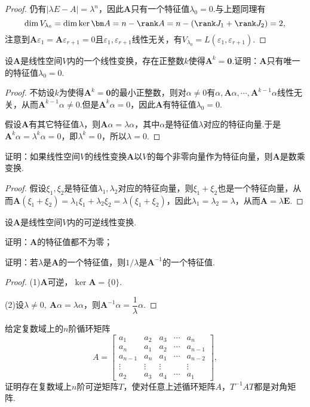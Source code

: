 \begin{proof}
	仍有$|\lambda E-A|=\lambda^n$，因此$\bm A$只有一个特征值$\lambda_0=0$.与上题同理有
	\[
		\dim V_{\lambda_0}=\dim\ker\bm A=n-\rank A=n-(\rank J_1+\rank J_2)=2,
	\]
	注意到$\bm A\varepsilon_1=\bm A\varepsilon_{r+1}=0$且$\varepsilon_1,\varepsilon_{r+1}$线性无关，有$V_{\lambda_0}=L(\varepsilon_1,\varepsilon_{r+1})$.
\end{proof}
\begin{prob}[7]
	设$\bm A$是线性空间$V$内的一个线性变换，存在正整数$k$使得$\bm A^k=\bm 0$.证明：$\bm A$只有唯一的特征值$\lambda_0=0$.
\end{prob}
\begin{proof}
	不妨设$k$为使得$\bm A^k=\bm 0$的最小正整数，则对$\alpha\ne0$有$\alpha,\bm A\alpha,\cdots,\bm A^{k-1}\alpha$线性无关，从而$\bm A^{k-1}\alpha\ne0$.但是$\bm A^k\alpha=0$，因此$\bm A$有特征值$\lambda_0=0$.

	假设$\bm A$有其它特征值$\lambda$，则$\bm A\alpha=\lambda\alpha$，其中$\alpha$是特征值$\lambda$对应的特征向量.于是$\bm A^k\alpha=\lambda^k\alpha=0$，即$\lambda^k=0$，所以$\lambda=0$.
\end{proof}
\begin{prob}[9]
	证明：如果线性空间$V$的线性变换$\bm A$以$V$的每个非零向量作为特征向量，则$\bm A$是数乘变换.
\end{prob}
\begin{proof}
	假设$\xi_1,\xi_2$是特征值$\lambda_1,\lambda_2$对应的特征向量，则$\xi_1+\xi_2$也是一个特征向量，从而$\bm A(\xi_1+\xi_2)=\lambda_1\xi_1+\lambda_2\xi_2=\lambda(\xi_1+\xi_2)$，因此$\lambda_1=\lambda_2=\lambda$，从而$\bm A=\lambda\bm E$.
\end{proof}
\begin{prob}[10]
	设$\bm A$是线性空间$V$内的可逆线性变换.
	\begin{mylist}
		\item 证明：$\bm A$的特征值都不为零；
		\item 证明：若$\lambda$是$\bm A$的一个特征值，则$1/\lambda$是$\bm A^{-1}$的一个特征值.
	\end{mylist}
\end{prob}
\begin{proof}
	(1)$\bm A$可逆，$\ker\bm A=\{0\}$.

	(2)设$\lambda\ne0,\ \bm A\alpha=\lambda\alpha$，则$\bm A^{-1}\alpha=\dfrac{1}{\lambda}\alpha$.
\end{proof}
\begin{prob}[11]
	给定复数域上的$n$阶循环矩阵
	\[
		A=\begin{bmatrix}
			a_1     & a_2    & a_3    & \cdots & a_n     \\
			a_n     & a_1    & a_2    & \cdots & a_{n-1} \\
			a_{n-1} & a_n    & a_1    & \cdots & a_{n-2} \\
			\vdots  & \vdots & \vdots &        & \vdots  \\
			a_2     & a_3    & a_4    & \cdots & a_1
		\end{bmatrix},
	\]
	证明存在复数域上$n$阶可逆矩阵$T$，使对任意上述循环矩阵$A$，$T^{-1}AT$都是对角矩阵.
\end{prob}
